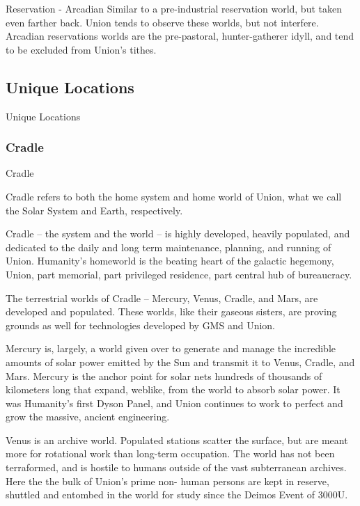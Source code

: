              Reservation - Arcadian               Similar to a pre-industrial reservation world, but taken
                                                  even farther back. Union tends to observe these
                                                  worlds, but not interfere. Arcadian reservations worlds
                                                  are the pre-pastoral, hunter-gatherer idyll, and tend to
                                                  be excluded from Union’s tithes.


\subsection{Unique Locations}
Unique Locations

\subsubsection{Cradle}
Cradle




Cradle refers to both the home system and home world of Union, what we call the Solar System
and Earth, respectively.


Cradle -- the system and the world -- is highly developed, heavily populated, and dedicated to
the daily and long term maintenance, planning, and running of Union. Humanity's homeworld is
the beating heart of the galactic hegemony, Union, part memorial, part privileged residence, part
central hub of bureaucracy.


The terrestrial worlds of Cradle -- Mercury, Venus, Cradle, and Mars, are developed and
populated. These worlds, like their gaseous sisters, are proving grounds as well for technologies
developed by GMS and Union.


Mercury is, largely, a world given over to generate and manage the incredible amounts of solar
power emitted by the Sun and transmit it to Venus, Cradle, and Mars. Mercury is the anchor
point for solar nets hundreds of thousands of kilometers long that expand, weblike, from the
world to absorb solar power. It was Humanity’s first Dyson Panel, and Union continues to work to
perfect and grow the massive, ancient engineering.


Venus is an archive world. Populated stations scatter the surface, but are meant more for
rotational work than long-term occupation. The world has not been terraformed, and is hostile to
humans outside of the vast subterranean archives. Here the the bulk of Union’s prime non-
human persons are kept in reserve, shuttled and entombed in the world for study since the
Deimos Event of 3000U.


